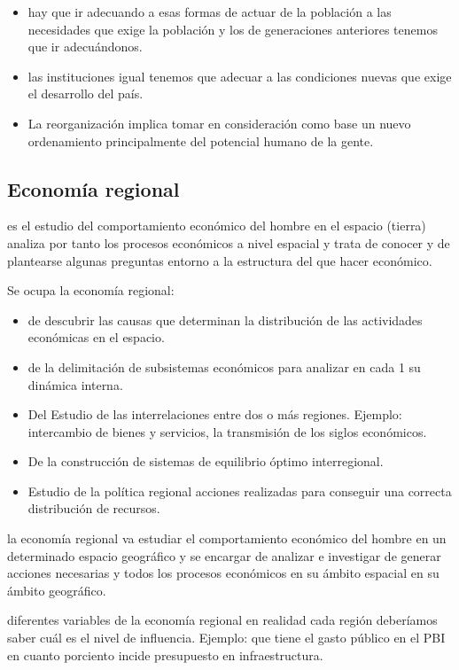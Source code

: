\documentclass[
  a4paper,
]{article}
\providecommand{\tightlist}{%
  \setlength{\itemsep}{0pt}\setlength{\parskip}{0pt}}\usepackage{longtable,booktabs,array}
\begin{document}
\begin{itemize}
\tightlist
\item
  hay que ir adecuando a esas formas de actuar de la población a las
  necesidades que exige la población y los de generaciones anteriores
  tenemos que ir adecuándonos.
\item
  las instituciones igual tenemos que adecuar a las condiciones nuevas
  que exige el desarrollo del país.
\item
  La reorganización implica tomar en consideración como base un nuevo
  ordenamiento principalmente del potencial humano de la gente.
\end{itemize}

\hypertarget{economuxeda-regional}{%
\subsection{Economía regional}\label{economuxeda-regional}}

es el estudio del comportamiento económico del hombre en el espacio
(tierra) analiza por tanto los procesos económicos a nivel espacial y
trata de conocer y de plantearse algunas preguntas entorno a la
estructura del que hacer económico.

Se ocupa la economía regional:

\begin{itemize}
\tightlist
\item
  de descubrir las causas que determinan la distribución de las
  actividades económicas en el espacio.
\item
  de la delimitación de subsistemas económicos para analizar en cada 1
  su dinámica interna.
\item
  Del Estudio de las interrelaciones entre dos o más regiones. Ejemplo:
  intercambio de bienes y servicios, la transmisión de los siglos
  económicos.
\item
  De la construcción de sistemas de equilibrio óptimo interregional.
\item
  Estudio de la política regional acciones realizadas para conseguir una
  correcta distribución de recursos.
\end{itemize}

la economía regional va estudiar el comportamiento económico del hombre
en un determinado espacio geográfico y se encargar de analizar e
investigar de generar acciones necesarias y todos los procesos
económicos en su ámbito espacial en su ámbito geográfico.

diferentes variables de la economía regional en realidad cada región
deberíamos saber cuál es el nivel de influencia. Ejemplo: que tiene el
gasto público en el PBI en cuanto porciento incide presupuesto en
infraestructura.
\end{document}
